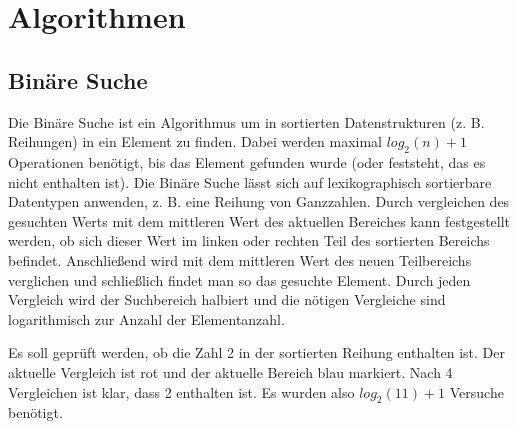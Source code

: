 \section{Algorithmen}

\subsection{Binäre Suche}

Die Binäre Suche ist ein Algorithmus um in sortierten Datenstrukturen (z. B. Reihungen)
in ein Element zu finden. Dabei werden maximal $log_{2}(n) + 1$ Operationen benötigt,
bis das Element gefunden wurde (oder feststeht, das es nicht enthalten ist).
Die Binäre Suche lässt sich auf lexikographisch sortierbare Datentypen anwenden,
z. B. eine Reihung von Ganzzahlen. Durch vergleichen des gesuchten Werts mit dem mittleren
Wert des aktuellen Bereiches kann festgestellt werden, ob sich dieser Wert im linken oder
rechten Teil des sortierten Bereichs befindet. Anschließend wird mit dem mittleren Wert
des neuen Teilbereichs verglichen und schließlich findet man so das gesuchte Element.
Durch jeden Vergleich wird der Suchbereich halbiert und die nötigen Vergleiche sind
logarithmisch zur Anzahl der Elementanzahl.

\vspace*{0.3cm}
Es soll geprüft werden, ob die Zahl 2 in der sortierten Reihung enthalten ist.
Der aktuelle Vergleich ist rot und der aktuelle Bereich blau markiert.
Nach 4 Vergleichen ist klar, dass 2 enthalten ist. 
Es wurden also $log_{2}(11) + 1$ Versuche benötigt.


%
%


